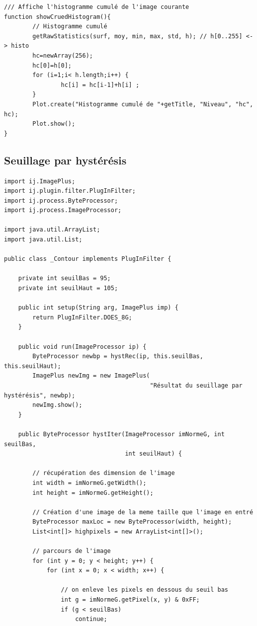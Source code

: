\documentclass[a4paper,11pt]{article}
\begin{document}
\begin{lstlisting}[caption=Macro de calcul des maxima locaux]
/// Affiche l'histogramme cumulé de l'image courante
function showCruedHistogram(){
        // Histogramme cumulé
        getRawStatistics(surf, moy, min, max, std, h); // h[0..255] <-> histo
        hc=newArray(256);
        hc[0]=h[0];
        for (i=1;i< h.length;i++) {
                hc[i] = hc[i-1]+h[i] ;
        }
        Plot.create("Histogramme cumulé de "+getTitle, "Niveau", "hc", hc);
        Plot.show();
}
  \end{lstlisting}
  
  \newpage

  \subsection{Seuillage par hystérésis}
  
  \begin{lstlisting}[caption=Plugin pour le seuillage des maxima locaux par hystérésis]
import ij.ImagePlus;
import ij.plugin.filter.PlugInFilter;
import ij.process.ByteProcessor;
import ij.process.ImageProcessor;

import java.util.ArrayList;
import java.util.List;

public class _Contour implements PlugInFilter {

    private int seuilBas = 95;
    private int seuilHaut = 105;

    public int setup(String arg, ImagePlus imp) {
        return PlugInFilter.DOES_8G;
    }

    public void run(ImageProcessor ip) {
        ByteProcessor newbp = hystRec(ip, this.seuilBas, this.seuilHaut);
        ImagePlus newImg = new ImagePlus(
                                         "Résultat du seuillage par hystérésis", newbp);
        newImg.show();
    }

    public ByteProcessor hystIter(ImageProcessor imNormeG, int seuilBas,
                                  int seuilHaut) {

        // récupération des dimension de l'image
        int width = imNormeG.getWidth();
        int height = imNormeG.getHeight();

        // Création d'une image de la meme taille que l'image en entré
        ByteProcessor maxLoc = new ByteProcessor(width, height);
        List<int[]> highpixels = new ArrayList<int[]>();

        // parcours de l'image
        for (int y = 0; y < height; y++) {
            for (int x = 0; x < width; x++) {

                // on enleve les pixels en dessous du seuil bas
                int g = imNormeG.getPixel(x, y) & 0xFF;
                if (g < seuilBas)
                    continue;


\end{lstlisting}
\end{document}
